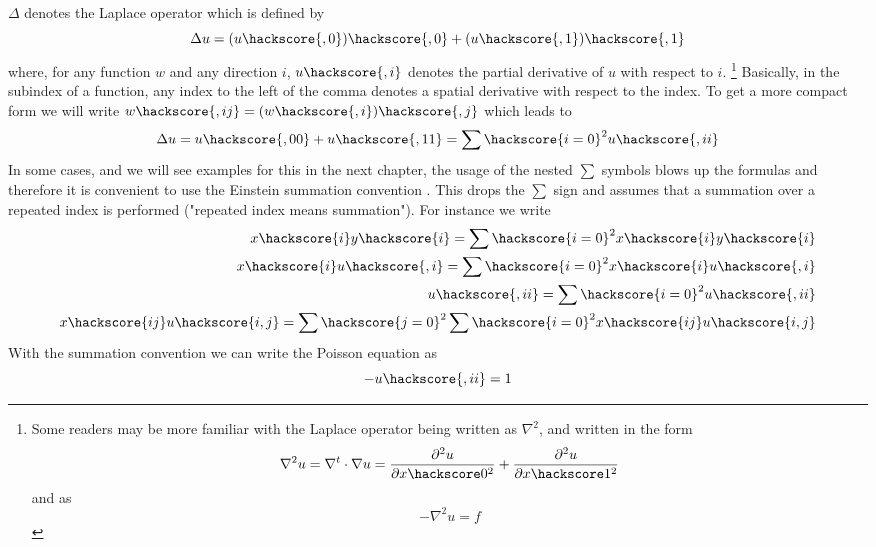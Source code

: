 $\Delta$ denotes the Laplace operator which is defined by
\begin{equation}
\Delta u = (u\hackscore {,0})\hackscore{,0}+(u\hackscore{,1})\hackscore{,1}
\label{eq:FirstSteps.1.1}
\end{equation}
where, for any function $w$ and any direction $i$, $u\hackscore{,i}$
denotes the partial derivative  of $u$ with respect to $i$.  
\footnote{Some readers
may be more familiar with the Laplace operator being written
as $\nabla^2$, and written in the form
\begin{equation*}
\nabla^2 u = \nabla^t \cdot \nabla u =  \frac{\partial^2 u}{\partial x\hackscore 0^2} 
+ \frac{\partial^2 u}{\partial  x\hackscore 1^2}
\end{equation*}
and  as
\begin{equation*}
-\nabla^2 u = f
\end{equation*}
}
Basically, in the subindex of a function, any index to the left of the comma denotes a spatial derivative with respect 
to the index. To get a more compact form we will write $w\hackscore{,ij}=(w\hackscore {,i})\hackscore{,j}$
which leads to
\begin{equation}
\Delta u = u\hackscore{,00}+u\hackscore{,11}=\sum\hackscore{i=0}^2 u\hackscore{,ii}
\label{eq:FirstSteps.1.1b}
\end{equation}
In some cases, and we will see examples for this in the next chapter,
the usage of the nested $\sum$ symbols blows up the formulas and therefore
it is convenient to use the Einstein summation convention . This 
drops the $\sum$ sign and assumes that a summation over a repeated index is performed 
("repeated index means summation"). For instance we write
\begin{eqnarray}
x\hackscore{i}y\hackscore{i}=\sum\hackscore{i=0}^2 x\hackscore{i}y\hackscore{i}   \\
x\hackscore{i}u\hackscore{,i}=\sum\hackscore{i=0}^2 x\hackscore{i}u\hackscore{,i}   \\
u\hackscore{,ii}=\sum\hackscore{i=0}^2 u\hackscore{,ii} \\
x\hackscore{ij}u\hackscore{i,j}=\sum\hackscore{j=0}^2\sum\hackscore{i=0}^2 x\hackscore{ij}u\hackscore{i,j}   \\
\label{eq:FirstSteps.1.1c}
\end{eqnarray}
With the summation convention we can write the Poisson equation  as
\begin{equation}
- u\hackscore{,ii} =1 
\label{eq:FirstSteps.1.sum}
\end{equation}
